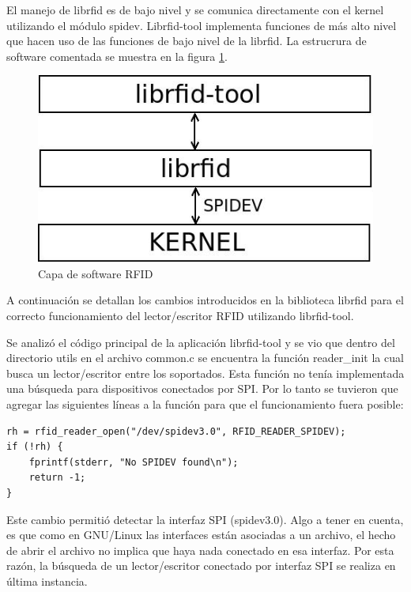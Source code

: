 El manejo de librfid es de bajo nivel y se comunica directamente con el kernel utilizando el módulo spidev. Librfid-tool implementa funciones de más alto nivel que hacen uso de las funciones de bajo nivel de la librfid. La estrucrura de software comentada se muestra en la figura \ref{sw_RFID}.

\begin{figure}[H]
\centering
  \begin{center}
  \includegraphics[scale=.4]{Imagenes/librfid-tool.jpg} 
  \end{center}
  \caption{Capa de software RFID}\label{sw_RFID} 
\end{figure}


A continuación se detallan los cambios introducidos en la biblioteca librfid para el correcto funcionamiento del lector/escritor RFID utilizando librfid-tool.

\bigskip
Se analizó el código principal de la aplicación librfid-tool y se vio que dentro del directorio utils en el archivo common.c se encuentra la función reader\_init la cual busca un lector/escritor entre los soportados. Esta función no tenía implementada una búsqueda para dispositivos conectados por SPI. Por lo tanto se tuvieron que agregar las siguientes líneas a la función para que el funcionamiento fuera posible:

\begin{verbatim}
rh = rfid_reader_open("/dev/spidev3.0", RFID_READER_SPIDEV);
if (!rh) {
    fprintf(stderr, "No SPIDEV found\n");
    return -1;
}
\end{verbatim}

Este cambio permitió detectar la interfaz SPI (spidev3.0). Algo a tener en cuenta, es que como en GNU/Linux las interfaces están asociadas a un archivo, el hecho de abrir el archivo no implica que haya nada conectado en esa interfaz. Por esta razón, la búsqueda de un lector/escritor conectado por interfaz SPI se realiza en última instancia.

